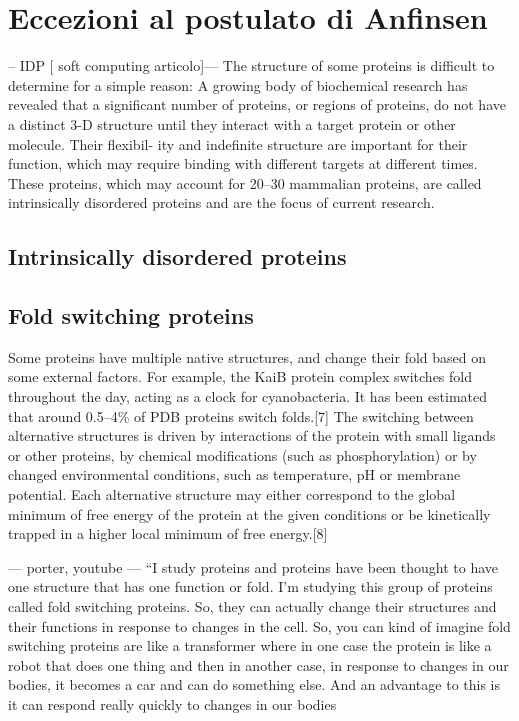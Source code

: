 \section{Eccezioni al postulato di Anfinsen}

-- IDP [ soft computing articolo]---
The structure of some proteins is difficult to determine
for a simple reason: A growing body of biochemical research
has revealed that a significant number of proteins, or regions
of proteins, do not have a distinct 3-D structure until they
interact with a target protein or other molecule. Their flexibil-
ity and indefinite structure are important for their function,
which may require binding with different targets at different
times. These proteins, which may account for 20–30%
mammalian proteins, are called intrinsically disordered proteins
and are the focus of current research.


\subsection{Intrinsically disordered proteins}

\subsection{Fold switching proteins} \label{sec:fold-switching-proteins}
Some proteins have multiple native structures, and change their fold based on some external factors. For example, the KaiB protein complex switches fold throughout the day, acting as a clock for cyanobacteria. It has been estimated that around 0.5–4\% of PDB proteins switch folds.[7] The switching between alternative structures is driven by interactions of the protein with small ligands or other proteins, by chemical modifications (such as phosphorylation) or by changed environmental conditions, such as temperature, pH or membrane potential. Each alternative structure may either correspond to the global minimum of free energy of the protein at the given conditions or be kinetically trapped in a higher local minimum of free energy.[8]


--- porter, youtube ---
“I study proteins and proteins have been thought to have one structure that has one function or fold. I'm studying this group of proteins called fold switching proteins. So, they can actually change their structures and their functions in response to changes in the cell. So, you can kind of imagine fold switching proteins are like a transformer where in one case the protein is like a robot that does one thing and then in another case, in response to changes in our bodies, it becomes a car and can do something else. And an advantage to this is it can respond really quickly to changes in our bodies

